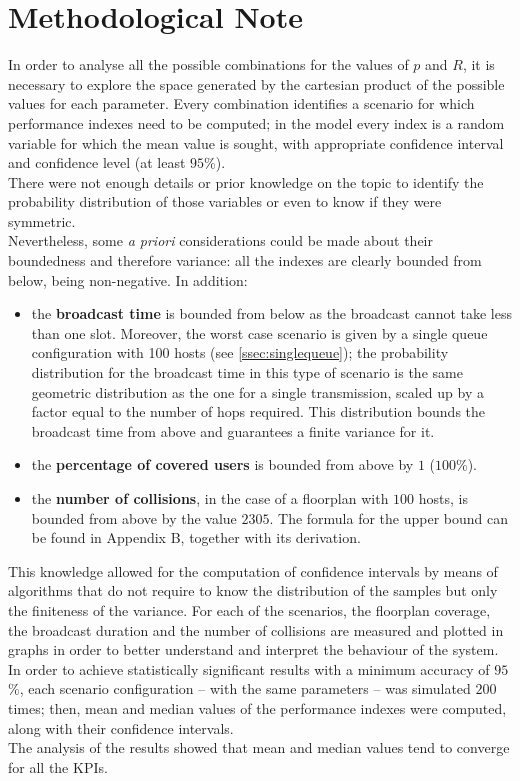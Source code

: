\section*{Methodological Note}\label{Methodological}
In order to analyse all the possible combinations for the values of $p$ and
$R$, it is necessary to explore the space generated by the cartesian product of
the possible values for each parameter. Every combination identifies a scenario
for which performance indexes need to be computed; in the model every index is
a random variable for which the mean value is sought, with appropriate confidence
interval and confidence level (at least $95$\%).\\
There were not enough details or prior knowledge on the topic to identify the
probability distribution of those variables or even to know if they were
symmetric.\\
Nevertheless, some \textit{a priori} considerations could be made about their
boundedness and therefore variance: all the indexes are clearly bounded from
below, being non-negative. In addition:
\begin{itemize}
    \item the \textbf{broadcast time} is bounded from below as the broadcast
	cannot take less than one slot. Moreover, the worst case scenario is given
	by a single queue configuration with 100 hosts (see \ref{ssec:singlequeue});
	the probability distribution for the broadcast time in this type of scenario
	is the same geometric distribution as the one for a single transmission,
	scaled up by a factor equal to the number of hops required. This
	distribution bounds the broadcast time from above and guarantees a finite
	variance for it.
    \item the \textbf{percentage of covered users} is bounded from above by
	$1$ ($100$\%).
    \item the \textbf{number of collisions}, in the case of a floorplan with
	$100$ hosts, is bounded from above by the value $2305$. The formula for the
	upper bound can be found in Appendix B, together with its derivation.
\end{itemize} 
This knowledge allowed for the computation of confidence intervals by means of
algorithms that do not require to know the distribution of the samples but only
the finiteness of the variance.
\hfill \break
For each of the scenarios, the floorplan coverage, the broadcast duration and
the number of collisions are measured and plotted in graphs in order to 
better understand and interpret the behaviour of the system.\\
In order to achieve statistically significant results with a minimum accuracy
of $95$\%, each scenario configuration -- with the same parameters -- was
simulated $200$ times; then, mean and median values of the performance
indexes were computed, along with their confidence intervals.\\
The analysis of the results showed that mean and median values tend to converge
for all the KPIs.

